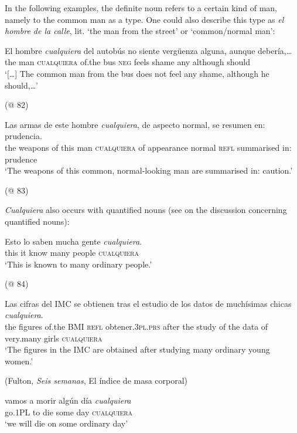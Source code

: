 In the following examples, the definite noun refers to a certain kind of man, namely to the common man {as a type}. One could also describe this type as \textit{el hombre de la calle}, lit. ‘the man from the street’ or ‘common/normal man’:

\ea \label{ex:key:150}
\gll  El hombre \textit{cualquiera} del autobús no siente vergüenza alguna, aunque debería,…\\
the man \textsc{cualquiera} of.the bus \textsc{neg} feels shame any although should\\
\glt ‘[…] The common man from the bus does not feel any shame, although he should,…’

  (@ 82)
  \z

\ea \label{ex:key:189}
\gll Las armas de este hombre \textit{cualquiera}, de aspecto normal, se resumen en: prudencia.\\
the weapons of this man \textsc{cualquiera} of appearance normal \textsc{refl} summarised in: prudence\\
\glt ‘The weapons of this common, normal-looking man are summarised in: caution.’

  (@ 83)
\z

\textit{Cualquiera} also occurs with quantified nouns (see  on the discussion concerning quantified nouns):

\ea \label{bkm:Ref58144031} %
\gll Esto lo saben mucha gente \textit{cualquiera}.\\
this it know many people \textsc{cualquiera}\\
\glt ‘This is known to many ordinary people.’

  (@ 84)
\z


\ea \label{bkm:Ref63546096} %
\gll Las cifras del IMC se obtienen tras el estudio de los datos de muchísimas chicas \textit{cualquiera}.\\
the figures of.the BMI \textsc{refl} obtener.\textsc{3pl.prs} after the study of the data of very.many girls \textsc{cualquiera}\\
\glt ‘The figures in the IMC are obtained after studying many ordinary young women.’

  (Fulton, \textit{Seis semanas}, El índice de masa corporal)
\z 

\ea \label{ex:key:192}
\gll vamos a morir algún día \textit{cualquiera}\\
go.\textsc{1PL} to die some day \textsc{cualquiera}\\
\glt ‘we will die on some ordinary day’

